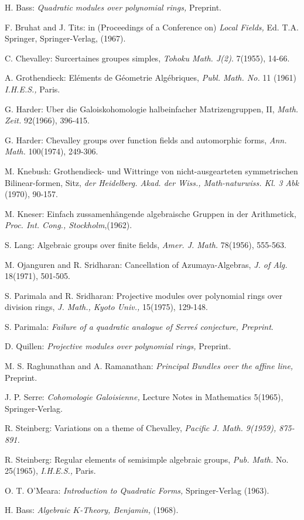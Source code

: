 \begin{thebibliography}{99}
 H. Bass: {\em Quadratic modules over polynomial rings, } Preprint.

 F. Bruhat and J. Tits: in (Proceedings of a Conference on) {\em Local Fields,} Ed. T.A. Springer, Springer-Verlag, (1967).

 C. Chevalley: Sur\pageoriginale certaines groupes simples, {\em Tohoku Math. J(2)}. 7(1955), 14-66.

 A. Grothendieck: El\'ements de G\'eometrie Alg\'ebriques, {\em Publ. Math. No.} 11 (1961) {\em I.H.E.S.,} Paris.

 G. Harder: Uber die Galoiskohomologie halbeinfacher Matrizengruppen, II, {\em Math. Zeit.} 92(1966), 396-415.

 G. Harder: Chevalley groups over function fields and automorphic forms,  {\em Ann. Math.} 100(1974), 249-306.

 M. Knebush: Grothendieck- und Wittringe von nicht-ausgearteten symmetrischen Bilinear-formen, Sitz, {\em der Heidelberg. Akad. der Wiss., Math-naturwiss. Kl. 3 Abk} (1970), 90-157.

 M. Kneser: Einfach zussamenh\"angende algebraische Gruppen in der Arithmetick, {\em Proc. Int. Cong., Stockholm},(1962).

 S. Lang: Algebraic groups over finite fields, {\em Amer. J. Math.} 78(1956), 555-563. 


 M. Ojanguren and R. Sridharan: Cancellation of Azumaya-Algebras, {\em J. of Alg. } 18(1971), 501-505.

 S. Parimala and R. Sridharan: Projective modules over polynomial rings over division rings, {\em J. Math., Kyoto Univ.,} 15(1975), 129-148.

 S. Parimala: {\em Failure of a quadratic analogue of Serre\'s conjecture, Preprint}.

 D. Quillen: {\em Projective modules over polynomial rings,} Preprint.

  M. S. Raghunathan and A. Ramanathan: {\em Principal Bundles over the affine line,} Preprint.

 J. P. Serre: {\em Cohomologie Galoisienne,} Lecture Notes in Mathematics 5(1965), Springer-Verlag.

 R. Steinberg: Variations on a theme of Chevalley, {\em Pacific J. Math. 9(1959), 875-891.}

 R. Steinberg: Regular elements of semisimple algebraic groups, {\em Pub. Math.} No. 25(1965), {\em I.H.E.S.,} Paris.

 O. T. O'Meara: {\em Introduction to Quadratic Forms,} Springer-Verlag (1963).

 H. Bass: {\em Algebraic $K$-Theory, Benjamin,} (1968).

\end{thebibliography}
